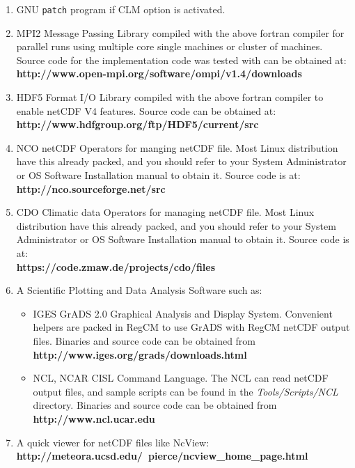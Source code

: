 \begin{enumerate}
\item GNU \verb=patch= program if CLM option is activated.
\item MPI2 Message Passing Library compiled with the above fortran compiler
for parallel runs using multiple core single machines or cluster of machines.
Source code for the implementation code was tested with can be obtained at: \\
{\bf http://www.open-mpi.org/software/ompi/v1.4/downloads}
\item HDF5 Format I/O Library compiled with the above fortran compiler to
enable netCDF V4 features. Source code can be obtained at: \\
{\bf http://www.hdfgroup.org/ftp/HDF5/current/src}
\item NCO netCDF Operators for manging netCDF file. Most Linux distribution
have this already packed, and you should refer to your System Administrator or
OS Software Installation manual to obtain it. Source code is at: \\
{\bf http://nco.sourceforge.net/src}
\item CDO Climatic data Operators for managing netCDF file. Most Linux
distribution have this already packed, and you should refer to your System
Administrator or OS Software Installation manual to obtain it.
Source code is at: \\
{\bf https://code.zmaw.de/projects/cdo/files}
\item A Scientific Plotting and Data Analysis Software such as:
\begin{itemize}
\item IGES GrADS 2.0 Graphical Analysis and Display System. Convenient helpers
are packed in RegCM to use GrADS with RegCM netCDF output files.
Binaries and source code can be obtained from \\
{\bf http://www.iges.org/grads/downloads.html}
\item NCL, NCAR CISL Command Language. The NCL can read netCDF output files, and
sample scripts can be found in the {\em Tools/Scripts/NCL} directory.
Binaries and source code can be obtained from \\
{\bf http://www.ncl.ucar.edu}
\end{itemize}
\item A quick viewer for netCDF files like NcView: \\
{\bf http://meteora.ucsd.edu/~pierce/ncview\_home\_page.html}
\end{enumerate}

